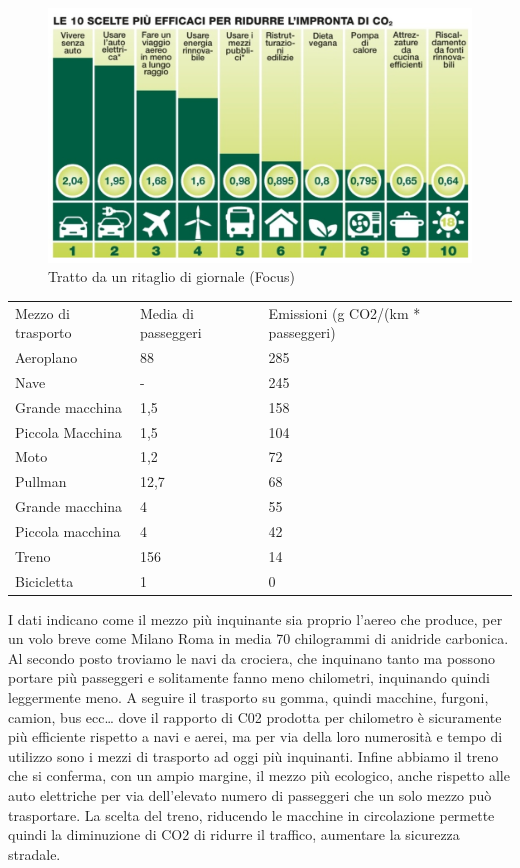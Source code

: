 \documentclass[12pt]{book} %
\begin{document}
\needspace{4cm}
\begin{figure}[H]
  \centering
  \includegraphics[width=0.95\linewidth]{images/Libro-img019.jpg}
  \caption{Tratto da un ritaglio di giornale (Focus)}
\end{figure}

\begin{table}[]
\begin{tabular}{lllll}
Mezzo di trasporto & Media di passeggeri & Emissioni (g CO2/(km * passeggeri) & & \\
Aeroplano & 88 & 285 & & \\
Nave & - & 245 & & \\
Grande macchina & 1,5 & 158 & & \\
Piccola Macchina & 1,5 & 104 & & \\
Moto & 1,2 & 72 & & \\
Pullman & 12,7 & 68 & & \\
Grande macchina & 4 & 55 & & \\
Piccola macchina & 4 & 42 & & \\
Treno & 156 & 14 & & \\
Bicicletta & 1 & 0 & & 
\end{tabular}
\end{table}

\bigskip

I dati indicano come il mezzo più
inquinante sia proprio l'aereo che produce, per un volo breve come Milano Roma in media 70
chilogrammi di anidride carbonica. Al secondo posto troviamo le navi da crociera, che inquinano tanto ma possono
portare più passeggeri e solitamente fanno meno chilometri, inquinando quindi leggermente meno. A seguire il trasporto
su gomma, quindi macchine, furgoni, camion, bus ecc… dove il rapporto di C02 prodotta per chilometro è sicuramente più
efficiente rispetto a navi e aerei, ma per via della loro numerosità e tempo di utilizzo sono i mezzi di trasporto ad
oggi più inquinanti. Infine abbiamo il treno che si conferma, con un ampio margine, il mezzo più ecologico, anche
rispetto alle auto elettriche per via dell'elevato numero di passeggeri che un solo mezzo può
trasportare. 
La scelta del treno, riducendo le macchine in circolazione permette quindi la diminuzione di CO2 di ridurre il
traffico, aumentare la sicurezza stradale.
\end{document}
